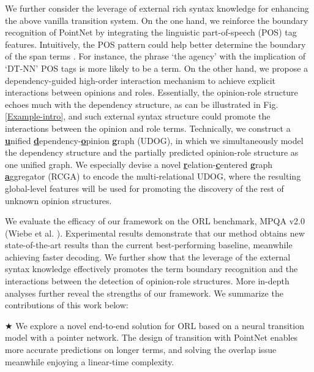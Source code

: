 \documentclass[letterpaper]{article} \usepackage{aaai22}  \usepackage{times}  \usepackage{helvet}  \usepackage{courier}  \usepackage[hyphens]{url}  \usepackage{graphicx} \urlstyle{rm} \def\UrlFont{\rm}  \usepackage{natbib}  \usepackage{caption} \DeclareCaptionStyle{ruled}{labelfont=normalfont,labelsep=colon,strut=off} \frenchspacing  \setlength{\pdfpagewidth}{8.5in}  \setlength{\pdfpageheight}{11in}  \usepackage{algorithm}
\begin{document}
We further consider the leverage of external rich syntax knowledge for enhancing the above vanilla transition system.
On the one hand, we reinforce the boundary recognition of PointNet by integrating the linguistic part-of-speech (POS) tag features.
Intuitively, the POS pattern could help better determine the boundary of the span terms \cite{lin-etal-2018-multi-lingual}.
For instance, the phrase `the agency' with the implication of `DT-NN' POS tags is more likely to be a term.
On the other hand, we propose a dependency-guided high-order interaction mechanism to achieve explicit interactions between opinions and roles.
Essentially, the opinion-role structure echoes much with the dependency structure, as can be illustrated in Fig. \ref{Example-intro}, and such external syntax structure could promote the interactions between the opinion and role terms.
Technically, we construct a \underline{\bf u}nified \underline{\bf d}ependency-\underline{\bf o}pinion \underline{\bf g}raph (UDOG), in which we simultaneously model the dependency structure and the partially predicted opinion-role structure as one unified graph.
We especially devise a novel \underline{\bf r}elation-\underline{\bf c}entered \underline{\bf g}raph \underline{\bf a}ggregator (RCGA) to encode the multi-relational UDOG,
where the resulting global-level features will be used for promoting the discovery of the rest of unknown opinion structures.













We evaluate the efficacy of our framework on the ORL benchmark, MPQA v2.0 (Wiebe et al. \citeyear{WiebeWC05}).
Experimental results demonstrate that our method obtains new state-of-the-art results than the current best-performing baseline, meanwhile achieving faster decoding.
We further show that the leverage of the external syntax knowledge effectively promotes the term boundary recognition and the interactions between the detection of opinion-role structures.
More in-depth analyses further reveal the strengths of our framework.
We summarize the contributions of this work below:




$\bigstar$ We explore a novel end-to-end solution for ORL based on a neural transition model with a pointer network.
The design of transition with PointNet enables more accurate predictions on longer terms, and solving the overlap issue meanwhile enjoying a linear-time complexity.
\end{document}
